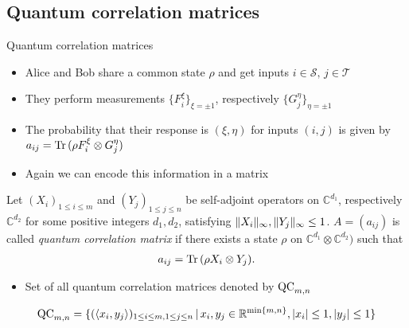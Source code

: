 \subsection{Quantum correlation matrices}

\begin{frame}[label = QCMot]{Quantum correlation matrices}
	\begin{itemize}
		\item<1-> Alice and Bob share a common state $ \rho $ and get inputs $ i \in \mathcal{S}, \, j \in \mathcal{T} $ 
		\item<2-> They perform measurements $ \{ F_i^{\xi} \}_{\xi = \pm 1} $, respectively $ \{ G_j^{\eta} \}_{\eta = \pm 1} $
		\item <3-> The probability that their response is $ (\xi,\eta) $ for inputs $ (i,j) $ is given by 
		$ a_{ij} = \textup{Tr} \, {(\rho F_i^\xi \otimes G_j^\eta )}  $
		\item<4-> Again we can encode this information in a matrix
	\end{itemize}
	\hyperlink{LCMot}{}
\end{frame}

\begin{frame}
	\begin{definition}
		Let $ (X_i)_{1 \le i \le m } $ and $ (Y_j)_{1 \le j \le n} $ be self-adjoint operators on $ \mathbb{C}^{d_1} $, respectively $ \mathbb{C}^{d_2} $ for some positive integers $ d_1,d_2 $, satisfying $  \Vert {X_i} \Vert_{\infty},  \Vert {Y_j} \Vert_{\infty} \le 1 $. $ A = (a_{ij}) $ is called {\itshape quantum correlation matrix} if there exists a state $ \rho $ on $\mathbb{C}^{d_1} \otimes \mathbb{C}^{d_2})$ such that 
		\begin{align*}\label{QCaij}
		a_{ij} = \textup{Tr} \, {(\rho X_i \otimes Y_j)} .
		\end{align*}
	\end{definition}
	\pause
	\begin{itemize}
		\item Set of all quantum correlation matrices denoted by $ \textup{QC}_{m,n} $
		\pause
	\end{itemize}
	\begin{lemma}
		\begin{align*}
		\textup{QC}_{m,n} = \{ (\langle x_i,y_j \rangle)_{1 \le i \le m, 1 \le j \le n} \,| \, x_i,y_j \in \mathbb{R}^{ \min \{m,n \} }, \vert x_i  \vert \le 1, \vert y_j \vert \le 1  \}
		\end{align*}
	\end{lemma}
\end{frame}


